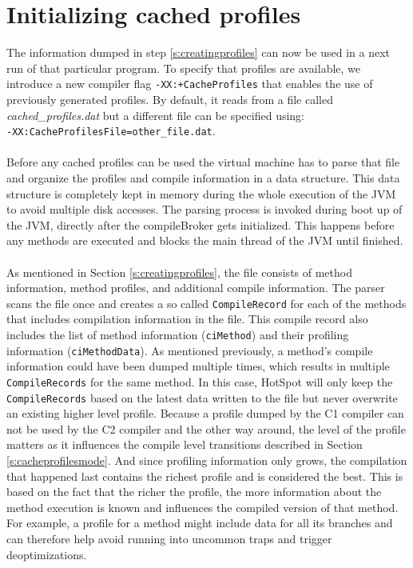 \section{Initializing cached profiles}
\label{s:initializingprofiles}
The information dumped in step \ref{s:creatingprofiles} can now be used in a next run of that particular program.
To specify that profiles are available, we introduce a new compiler flag \texttt{-XX:+CacheProfiles} that enables the use of previously generated profiles. By default, it reads from a file called \textit{cached\_profiles.dat} but a different file can be specified using:\\ \texttt{-XX:CacheProfilesFile=other\_file.dat}.
\\\\
Before any cached profiles can be used the virtual machine has to parse that file and organize the profiles and compile information in a data structure. This data structure is completely kept in memory during the whole execution of the JVM to avoid multiple disk accesses.
The parsing process is invoked during boot up of the JVM, directly after the compileBroker gets initialized. This happens before any methods are executed and blocks the main thread of the JVM until finished.
\\\\
As mentioned in Section \ref{s:creatingprofiles}, the file consists of method information, method profiles, and additional compile information. The parser scans the file once and creates a so called \texttt{CompileRecord} for each of the methods that includes compilation information in the file. This compile record also includes the list of method information (\texttt{ciMethod}) and their profiling information (\texttt{ciMethodData}).
As mentioned previously, a method's compile information could have been dumped multiple times, which results in multiple \texttt{CompileRecords} for the same method. In this case, HotSpot will only keep the \texttt{CompileRecords} based on the latest data written to the file but never overwrite an existing higher level profile.
Because a profile dumped by the C1 compiler can not be used by the C2 compiler and the other way around, the level of the profile matters as it influences the compile level transitions described in Section \ref{s:cacheprofilesmode}.
And since profiling information only grows, the compilation that happened last contains the richest profile and is considered the best.
This is based on the fact that the richer the profile, the more information about the method execution is known and influences the compiled version of that method. For example, a profile for a method might include data for all its branches and can therefore help avoid running into uncommon traps and trigger deoptimizations.

